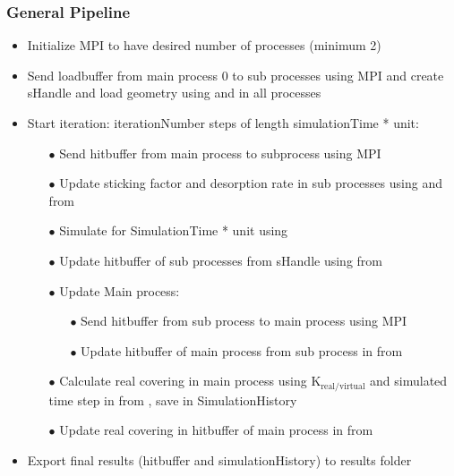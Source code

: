 \subsubsection{General Pipeline}
\begin{itemize}[noitemsep,topsep=0pt]
\item Initialize MPI to have desired number of processes (minimum 2)
\item Send loadbuffer from main process 0 to sub processes using MPI and create sHandle and load geometry using  and  in all processes
\item Start iteration: iterationNumber steps of length simulationTime * unit:
	\begin{itemize}[noitemsep,topsep=0pt]
	\item[$\bullet$] Send hitbuffer from main process to subprocess using MPI
	\item[$\bullet$] Update sticking factor and desorption rate in sub processes using  and  from 
	\item[$\bullet$] Simulate for SimulationTime * unit using 
	\item[$\bullet$] Update hitbuffer of sub processes from sHandle using  from 
	\item[$\bullet$] Update Main process:
		\begin{itemize}[noitemsep,topsep=0pt]
		\item[$\bullet$] Send hitbuffer from sub process to main process using MPI
		\item[$\bullet$] Update hitbuffer of main process from sub process in  from 
		\end{itemize}
	\item[$\bullet$] Calculate real covering in main process using $\text{K}_{\text{real}/\text{virtual}}$ and simulated time step in  from , save in SimulationHistory
	\item[$\bullet$] Update real covering in hitbuffer of main process in  from 
	\end{itemize}
\item Export final results (hitbuffer and simulationHistory) to results folder
\end{itemize}

